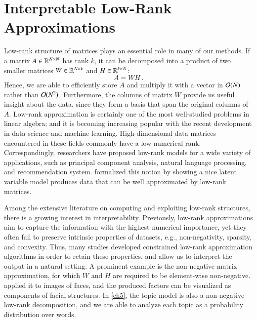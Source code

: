 \section{Interpretable Low\hyp{}Rank Approximations}\label{pre:lra}

Low\hyp{}rank structure of matrices plays an essential role in many of our
methods. If a matrix $A\in\mathbb{R}^{N\times N}$ has rank $k$, it can be
decomposed into a product of two smaller matrices $W\in\mathbb{R}^{N\times k}$ and
$H\in\mathbb{R}^{k\times N}$:
\begin{equation}\label{eqn:low_rank}
A = WH\,.
\end{equation}
Hence, we are able to efficiently store $A$ and multiply it with a vector in
$\mathcal{O}(N)$ rather than $\mathcal{O}(N^2)$. Furthermore, the columns of matrix $W$
provide us useful insight about the data, since they form a basis that span the
original columns of $A$. Low\hyp{}rank approximation is certainly one of the
most well\hyp{}studied problems in linear algebra; and it is becoming increasing
popular with the recent development in data science and machine learning. 
High\hyp{}dimensional data matrices encountered in these fields commonly have a
low numerical rank. Correspondingly, researchers have proposed low\hyp{}rank
models for a wide variety of applications, such as principal component analysis,
natural language processing, and recommendation system. \citet{udell2019big}
formalized this notion by showing a nice latent variable model produces data
that can be well approximated by low\hyp{}rank matrices.

Among the extensive literature on computing and exploiting low\hyp{}rank
structures, there is a growing interest in interpretability. Previously, 
low\hyp{}rank approximations aim to capture the information with the highest
numerical importance, yet they often fail to preserve intrinsic properties
of datasets, e.g., non\hyp{}negativity, sparsity, and convexity. Thus,
many studies developed constrained low\hyp{}rank approximation algorithms in
order to retain these properties, and allow us to interpret the output in a
natural setting. A prominent example is the non\hyp{}negative matrix
approximation, for which $W$ and $H$ are required to be element\hyp{}wise 
non\hyp{}negative. \citet{lee1999learning} applied it to images of faces, and
the produced factors can be visualized as components of facial structures. In 
\cref{ch5}, the topic model is also a non\hyp{}negative low\hyp{}rank
decomposition, and we are able to analyze each topic as a probability
distribution over words.

